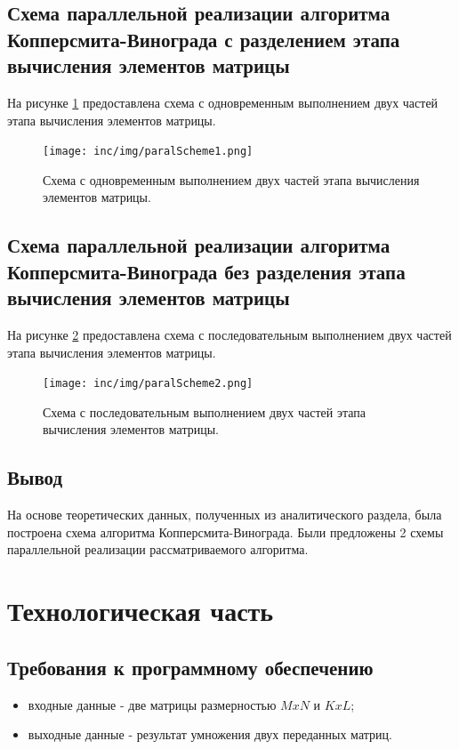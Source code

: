 \documentclass[12pt]{report}
\begin{document}
\section{Схема параллельной реализации алгоритма Копперсмита-Винограда с разделением этапа вычисления элементов матрицы}
На рисунке \ref{img:scheme1} предоставлена схема с одновременным выполнением двух частей этапа вычисления элементов матрицы.

\begin{figure}
\begin{center}
\texttt{[image: inc/img/paralScheme1.png]}
\captionsetup{justification=centering}
	\caption{Схема с одновременным выполнением двух частей этапа вычисления элементов матрицы.}
	\label{img:scheme1}	
\end{center}
\end{figure}
\newpage

\section{Схема параллельной реализации алгоритма Копперсмита-Винограда без разделения этапа вычисления элементов матрицы}
На рисунке \ref{img:scheme2} предоставлена схема с последовательным выполнением двух частей этапа вычисления элементов матрицы.

\begin{figure}
\begin{center}
\texttt{[image: inc/img/paralScheme2.png]}
\captionsetup{justification=centering}
	\caption{Схема с последовательным выполнением двух частей этапа вычисления элементов матрицы.}
	\label{img:scheme2}	
\end{center}
\end{figure}
\newpage

\section*{Вывод}
На основе теоретических данных, полученных из аналитического раздела, была построена схема алгоритма Копперсмита-Винограда. Были предложены 2 схемы параллельной реализации рассматриваемого алгоритма.

\chapter{Технологическая часть}
\section{Требования к программному обеспечению}
\begin{itemize}
\item входные данные - две матрицы размерностью $MxN$ и $KxL$;
\item выходные данные - результат умножения двух переданных матриц.
\end{itemize}
\end{document}
